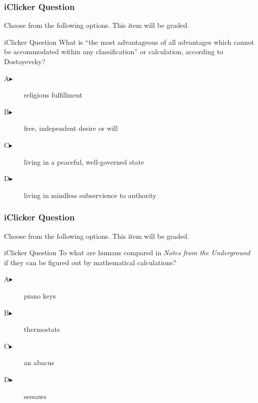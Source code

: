 \documentclass[xcolor=dvipsnames]{beamer}
\begin{document}
\begin{frame}
  \frametitle{iClicker Question}
Choose from the following options. This item will be graded.
\begin{block}{iClicker Question}
What is ``the most advantageous of all advantages which cannot be
accommodated within any classification'' or calculation, according to Dostoyevsky?
\end{block}
\begin{description}
\item[A\hspace{.2in}$\blacktriangleright$] religious fulfillment
\item[B\hspace{.2in}$\blacktriangleright$] free, independent desire or will
\item[C\hspace{.2in}$\blacktriangleright$] living in a peaceful, well-governed state
\item[D\hspace{.2in}$\blacktriangleright$] living in mindless subservience to authority
\end{description}
\end{frame}

\begin{frame}
  \frametitle{iClicker Question}
Choose from the following options. This item will be graded.
\begin{block}{iClicker Question}
  To what are humans compared in \emph{Notes from the Underground} if
  they can be figured out by mathematical calculations?
\end{block}
\begin{description}
\item[A\hspace{.2in}$\blacktriangleright$] piano keys
\item[B\hspace{.2in}$\blacktriangleright$] thermostats
\item[C\hspace{.2in}$\blacktriangleright$] an abacus
\item[D\hspace{.2in}$\blacktriangleright$] seesaws
\end{description}
\end{frame}
\end{document}
